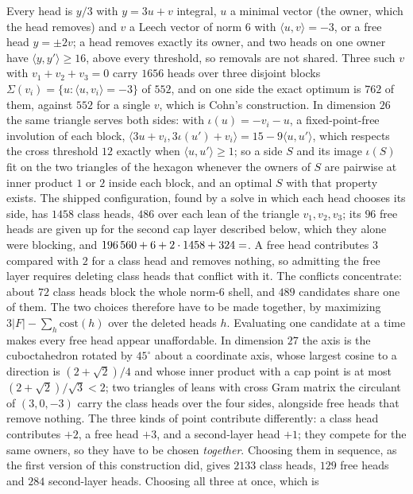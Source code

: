 \documentclass[11pt]{amsart}
\theoremstyle{remark}
\newcommand{\ip}[2]{\langle #1,#2\rangle}
\begin{document}
Every head is $y/3$ with $y=3u+v$ integral, $u$ a minimal vector (the owner,
which the head removes) and $v$ a Leech vector of norm $6$ with $\ip{u}{v}=-3$,
or a free head $y=\pm2v$; a head removes exactly its owner, and two heads on one
owner have $\ip{y}{y'}\ge16$, above every threshold, so removals are not shared.
Three such $v$ with $v_{1}+v_{2}+v_{3}=0$ carry $1656$ heads over three
disjoint blocks $\Sigma(v_{i})=\{u:\ip{u}{v_{i}}=-3\}$ of $552$, and on one side
the exact optimum is $762$ of them, against $552$ for a single $v$, which is
Cohn's construction. In dimension $26$ the same triangle serves both sides: with
$\iota(u)=-v_{i}-u$, a fixed-point-free involution of each block,
$\ip{3u+v_{i}}{3\iota(u')+v_{i}}=15-9\ip{u}{u'}$, which respects the cross
threshold $12$ exactly when $\ip{u}{u'}\ge1$; so a side $S$ and its image
$\iota(S)$ fit on the two triangles of the hexagon whenever the owners of $S$ are
pairwise at inner product $1$ or $2$ inside each block, and an optimal $S$ with
that property exists. The shipped configuration, found by a solve in which each
head chooses its side, has $1458$ class heads, $486$ over each lean of the
triangle $v_1,v_2,v_3$; its $96$ free heads are given up for the second cap layer described
below, which they alone were blocking, and
$196\,560+6+2\cdot1458+324=\Kh{26}$.  A free head contributes $3$ compared with $2$ for a class head and removes nothing,
so admitting the free layer requires deleting class heads that conflict with it.
The conflicts concentrate: about $72$ class heads block the whole norm-$6$ shell,
and $489$ candidates share one of them. The two choices therefore have to be made
together, by maximizing $3\lvert F\rvert-\sum_{h}\mathrm{cost}(h)$ over the
deleted heads $h$. Evaluating one candidate at a time makes every free head appear
unaffordable. In dimension $27$ the axis is
the cuboctahedron rotated by $45^{\circ}$ about a coordinate axis, whose largest
cosine to a direction is $(2+\sqrt2)/4$ and whose inner product with a cap point
is at most $(2+\sqrt2)/\sqrt3<2$; two triangles of leans with cross Gram matrix
the circulant of $(3,0,-3)$ carry the class heads over the four sides, alongside
free heads that remove nothing. The three kinds of point contribute differently:
a class head contributes $+2$, a free head $+3$, and a second-layer head $+1$;
they compete for the same
owners, so they have to be chosen \emph{together}. Choosing them in sequence, as
the first version of this construction did, gives $2133$ class heads, $129$ free
heads and $284$ second-layer heads. Choosing all three at once, which is
\end{document}
